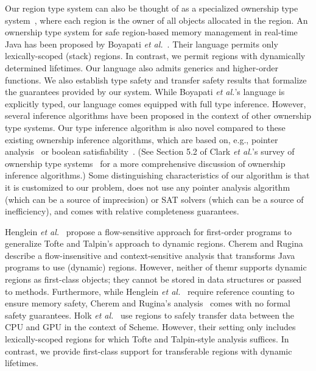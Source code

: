 \documentclass[a4paper,UKenglish]{lipics-v2018}
\newcommand{\rgn}{r}
\begin{document}
Our region type system can also be thought of as a specialized
ownership type system~\cite{OwnershipSurvey}, where each region is the
owner of all objects allocated in the region.
%
An ownership type system for safe region-based memory management in
real-time Java has been proposed by Boyapati \emph{et
al.}~\cite{MIT03}.  Their language permits only lexically-scoped
(stack) regions.  In contrast, we permit regions with dynamically
determined lifetimes.  Our language also admits generics and
higher-order functions.  We also establish type safety and transfer
safety results that formalize the guarantees provided by our system.
While Boyapati \emph{et al.}'s language is explicitly typed, our
language comes equipped with full type inference.  However, several
inference algorithms have been proposed in the context of other
ownership type systems.  Our type inference algorithm is also novel
compared to these existing ownership inference algorithms, which are
based on, e.g., pointer analysis~\cite{HuangEtAl:ECOOP12} or boolean
satisfiability~\cite{DietlEtAl:ECOOP11}.  (See Section 5.2 of Clark
\emph{et al.}'s survey of ownership type
systems~\cite{OwnershipSurvey} for a more comprehensive discussion of
ownership inference algorithms.) Some distinguishing characteristics
of our algorithm is that it is customized to our problem, does not use
any pointer analysis algorithm (which can be a source of imprecision)
or SAT solvers (which can be a source of inefficiency), and comes with
relative completeness guarantees.


Henglein \emph{et al.}~\cite{HMN01} propose a flow-sensitive approach
for first-order programs to generalize Tofte and Talpin's approach to
dynamic regions. Cherem and Rugina~\cite{CR04} describe a
flow-insensitive and context-sensitive analysis that transforms Java
programs to use (dynamic) regions.  However, neither of themr supports
dynamic regions as first-class objects; they cannot be stored in data
structures or passed to methods. Furthermore, while Henglein \emph{et
al.}~\cite{HMN01} require reference counting to ensure memory safety,
Cherem and Rugina's analysis~\cite{CR04} comes with no formal safety
guarantees.
%
Holk \emph{et al.}~\cite{gpu14} use regions to safely transfer data
between the CPU and GPU in the context of Scheme. However, their
setting only includes lexically-scoped regions for which Tofte and
Talpin-style analysis suffices. In contrast, we provide first-class
support for transferable regions with dynamic lifetimes.



\clearpage


\appendix




\renewcommand{\rgn}{\myownthrowexception}


\end{document}
